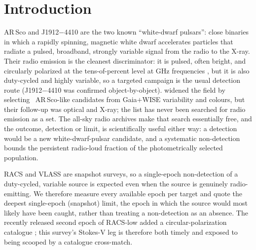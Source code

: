 \documentclass[twocolumn]{aastex631}
\begin{document}
\section{Introduction}
AR\,Sco \citep{marsh2016} and J1912$-$4410 \citep{pelisoli2023} are the two known
``white-dwarf pulsars'': close binaries in which a rapidly spinning, magnetic white dwarf
accelerates particles that radiate a pulsed, broadband, strongly variable signal from the radio
to the X-ray. Their radio emission is the cleanest discriminator: it is pulsed, often bright,
and circularly polarized at the tens-of-percent level at GHz frequencies \citep{stanway2018},
but it is also duty-cycled and highly variable, so a targeted campaign is the usual detection
route (J1912$-$4410 was confirmed object-by-object). \citet{pelisoli2025} widened the field by
selecting \wdNCand\ AR\,Sco-like candidates from Gaia$+$WISE variability and colours, but their
follow-up was optical and X-ray; the list has never been searched for radio emission as a set.
The all-sky radio archives make that search essentially free, and the outcome, detection or
limit, is scientifically useful either way: a detection would be a new white-dwarf-pulsar
candidate, and a systematic non-detection bounds the persistent radio-loud fraction of the
photometrically selected population.

RACS \citep{mcconnell2020} and VLASS \citep{lacy2020} are snapshot surveys, so a single-epoch
non-detection of a duty-cycled, variable source is expected even when the source is genuinely
radio-emitting. We therefore measure every available epoch per target and quote the deepest
single-epoch (snapshot) limit, the epoch in which the source would most likely have been
caught, rather than treating a non-detection as an absence. The recently released second epoch
of RACS-low added a circular-polarization catalogue \citep{racslow2}; this survey's Stokes-V
leg is therefore both timely and exposed to being scooped by a catalogue cross-match.
\end{document}
